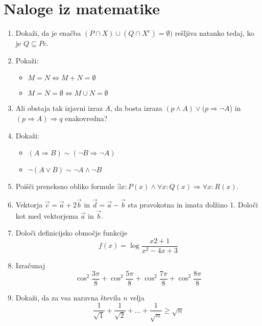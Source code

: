 \documentclass[a4paper,12pt]{article}
\begin{document}
\section*{Naloge iz matematike}

\begin{enumerate}

\item Dokaži, da je enačba $(P \cap X) \cup (Q \cap X^c) = \emptyset )$
rešljiva natanko tedaj, ko je $Q \subseteq Pc$.

\item Pokaži:

\begin{itemize}

\item $M = N \iff M + N = \emptyset$
\item $M = N = \emptyset \iff M \cup N = \emptyset$

\end{itemize}

\item Ali obstaja tak izjavni izraz $A$, da bosta izraza
$(p \wedge A) \vee (p \Rightarrow \neg A$) in $(p \Rightarrow A) \Rightarrow q$
enakovredna?

\item Dokaži: 
\begin{itemize}
    
\item $(A \Rightarrow B) \sim (\neg B \Rightarrow \neg A)$
\item $\neg(A \vee B) \sim \neg A \wedge \neg B$

\end{itemize}

\item Poišči preneksno obliko formule $\exists x : P(x) \wedge \forall x : Q(x) \Rightarrow \forall x : R(x)$.

\item Vektorja $\vec{c} = \vec{a} + 2 \vec{b}$ in $\vec{d}=\vec{a}-\vec{b}$
sta pravokotna in imata dolžino 1. Določi kot med vektorjema $\vec{a}$ in $\vec{b}$.

\item Določi definicijsko območje funkcije
\[
f(x) = \log \frac{x2 + 1}{x^2-4x+3}    
\]

\item Izračunaj
\[
\cos^2{\frac{3 \pi }{8}}+\cos^2{\frac{5\pi}{8}}+\cos^2{\frac{7\pi}{8}}+\cos^2{\frac{8\pi}{8}}    
\]

\item Dokaži, da za vsa naravna števila $n$ velja
\[
\frac{1}{\sqrt{1}}+\frac{1}{\sqrt{2}}+\dots+\frac{1}{\sqrt{n}}\ge\sqrt{n}
\]


\end{enumerate}
\end{document}
